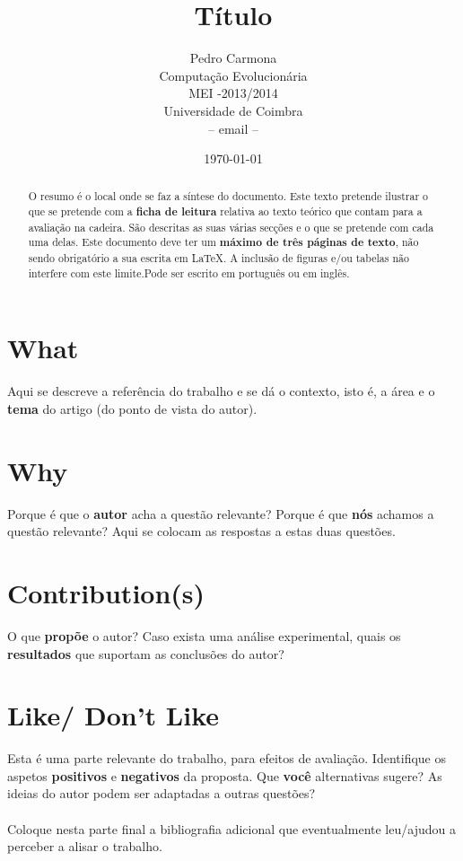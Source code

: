 \documentclass[12pt,portuguese,a4paper]{article}
\title{\Large{\textbf{Título}}}
\author{ Pedro Carmona \\ Computação Evolucionária\\ MEI -2013/2014 \\ Universidade de Coimbra \\ -- email --}
\date{\today}
\begin{document}
\maketitle


\begin{abstract}

O resumo é o local onde se faz a síntese do documento.
Este texto pretende ilustrar o que se pretende com a \textbf{ficha de leitura} relativa ao texto teórico que contam para a avaliação na cadeira. São descritas as suas várias secções e o que se pretende com cada uma delas.  Este documento deve ter um \textbf{máximo de três páginas de texto}, não sendo obrigatório a sua escrita em \LaTeX{}. A inclusão de figuras e/ou tabelas não  interfere com este limite.Pode ser escrito em português ou em inglês.
\end{abstract}

\section{What}

Aqui se descreve a referência do trabalho e se dá o contexto, isto é, a área e o \textbf{tema} do artigo (do ponto de vista do autor).

\section{Why}

Porque é que o \textbf{autor} acha a questão relevante? Porque é que \textbf{nós} achamos a questão relevante? Aqui se colocam as respostas a estas duas questões.

\section{Contribution(s)}

O que \textbf{propõe} o autor? Caso exista uma análise experimental, quais os \textbf{resultados} que suportam as conclusões do autor?


\section{Like/ Don't Like}

Esta é uma parte relevante do trabalho, para efeitos de avaliação. Identifique os aspetos \textbf{positivos} e \textbf{negativos} da proposta. Que \textbf{você} alternativas sugere? As ideias do autor podem ser adaptadas a outras questões?\\

\\

Coloque nesta parte final a bibliografia adicional que eventualmente leu/ajudou a perceber a alisar o trabalho.





%
\end{document}

